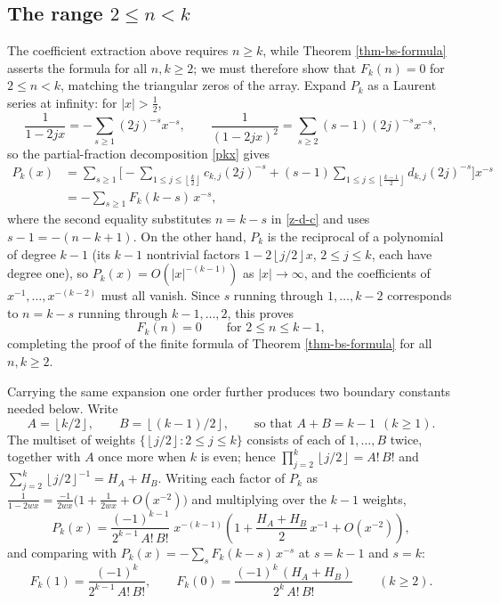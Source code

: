 \documentclass[a4paper]{amsart}
\numberwithin{equation}{section}
\newcommand{\floor}[1]{\left\lfloor #1 \right\rfloor}
\begin{document}
\subsection*{The range $2 \leq n < k$}
The coefficient extraction above requires $n \geq k$, while Theorem \ref{thm-bs-formula} asserts the formula for all $n, k \geq 2$; we must therefore show that $F_k(n) = 0$ for $2 \leq n < k$, matching the triangular zeros of the array. Expand $P_k$ as a Laurent series at infinity: for $|x| > \tfrac{1}{2}$,
\[
\frac{1}{1-2jx} = -\sum_{s \geq 1}(2j)^{-s}x^{-s}, \qquad \frac{1}{(1-2jx)^2} = \sum_{s \geq 2}(s-1)(2j)^{-s}x^{-s},
\]
so the partial-fraction decomposition \eqref{pkx} gives
\[
\begin{aligned}
P_k(x) &= \sum_{s \geq 1}\Bigg[-\sum_{1 \leq j \leq \floor{\frac{k}{2}}}c_{k,j}(2j)^{-s} + (s-1)\sum_{1 \leq j \leq \floor{\frac{k-1}{2}}}d_{k,j}(2j)^{-s}\Bigg]x^{-s} \\
&= -\sum_{s \geq 1} F_k(k-s)\, x^{-s},
\end{aligned}
\]
where the second equality substitutes $n = k - s$ in \eqref{z-d-c} and uses $s - 1 = -(n-k+1)$. On the other hand, $P_k$ is the reciprocal of a polynomial of degree $k - 1$ (its $k-1$ nontrivial factors $1 - 2\floor{j/2}x$, $2 \leq j \leq k$, each have degree one), so $P_k(x) = O(|x|^{-(k-1)})$ as $|x| \to \infty$, and the coefficients of $x^{-1}, \ldots, x^{-(k-2)}$ must all vanish. Since $s$ running through $1, \ldots, k-2$ corresponds to $n = k-s$ running through $k-1, \ldots, 2$, this proves
\[
F_k(n) = 0 \qquad \text{for } 2 \leq n \leq k-1,
\]
completing the proof of the finite formula of Theorem \ref{thm-bs-formula} for all $n, k \geq 2$.

Carrying the same expansion one order further produces two boundary constants needed below. Write
\[
A = \floor{k/2}, \qquad B = \floor{(k-1)/2}, \qquad\text{so that } A + B = k - 1 \ \ (k \geq 1).
\]
The multiset of weights $\{\floor{j/2} : 2 \leq j \leq k\}$ consists of each of $1, \ldots, B$ twice, together with $A$ once more when $k$ is even; hence $\prod_{j=2}^{k}\floor{j/2} = A!\,B!$ and $\sum_{j=2}^{k}\floor{j/2}^{-1} = H_A + H_B$. Writing each factor of $P_k$ as $\frac{1}{1-2wx} = \frac{-1}{2wx}\big(1 + \frac{1}{2wx} + O(x^{-2})\big)$ and multiplying over the $k-1$ weights,
\[
P_k(x) = \frac{(-1)^{k-1}}{2^{k-1}\,A!\,B!}\;x^{-(k-1)}\left(1 + \frac{H_A + H_B}{2}\,x^{-1} + O(x^{-2})\right),
\]
and comparing with $P_k(x) = -\sum_{s} F_k(k-s)\,x^{-s}$ at $s = k-1$ and $s = k$:
\begin{equation}\label{eq-laurent-boundary}
F_k(1) = \frac{(-1)^{k}}{2^{k-1}\,A!\,B!}, \qquad F_k(0) = \frac{(-1)^{k}\,(H_A + H_B)}{2^{k}\,A!\,B!} \qquad (k \geq 2).
\end{equation}
\end{document}
